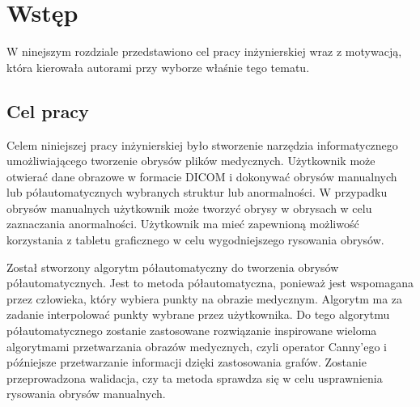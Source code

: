 \documentclass[a4paper,11pt,twoside,openright]{report}
\theoremstyle{definition}
\begin{document}
\thispagestyle{empty}
\newpage

\null\thispagestyle{empty}\newpage


\tableofcontents
\thispagestyle{empty}


\null\thispagestyle{empty}\newpage
\pagestyle{fancy}
\setcounter{page}{11} %

\chapter*{Wstęp}

W ninejszym rozdziale przedstawiono cel pracy inżynierskiej wraz z motywacją, która kierowała autorami przy wyborze właśnie tego tematu.

\section*{Cel pracy}

Celem niniejszej pracy inżynierskiej było stworzenie narzędzia informatycznego umożliwiającego tworzenie obrysów plików medycznych. Użytkownik może otwierać dane obrazowe w formacie DICOM i dokonywać obrysów manualnych lub półautomatycznych wybranych struktur lub anormalności. W przypadku obrysów manualnych użytkownik może tworzyć obrysy w obrysach w celu zaznaczania anormalności. Użytkownik ma mieć zapewnioną możliwość korzystania z tabletu graficznego w celu wygodniejszego rysowania obrysów.

Został stworzony algorytm półautomatyczny do tworzenia obrysów półautomatycznych. Jest to metoda półautomatyczna, ponieważ jest wspomagana przez człowieka, który wybiera punkty na obrazie medycznym. Algorytm ma za zadanie interpolować punkty wybrane przez użytkownika. Do tego algorytmu półautomatycznego zostanie zastosowane rozwiązanie inspirowane wieloma algorytmami przetwarzania obrazów medycznych, czyli operator Canny'ego i późniejsze przetwarzanie informacji dzięki zastosowania grafów. Zostanie przeprowadzona walidacja, czy ta metoda sprawdza się w celu usprawnienia rysowania obrysów manualnych.
\end{document}
